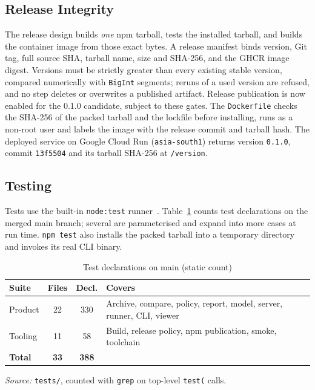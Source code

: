 \documentclass[conference]{IEEEtran}
\newcommand{\code}[1]{\texttt{#1}}
\begin{document}
\subsection{Release Integrity}
The release design builds \emph{one} npm tarball, tests the installed tarball,
and builds the container image from those exact bytes. A release manifest binds
version, Git tag, full source SHA, tarball name, size and SHA-256, and the GHCR
image digest. Versions must be strictly greater than every existing stable
version, compared numerically with \code{BigInt} segments; reruns of a used
version are refused, and no step deletes or overwrites a published artifact.
Release publication is now enabled for the 0.1.0 candidate, subject to these
gates. The \code{Dockerfile} checks the SHA-256 of the packed tarball and the
lockfile before installing, runs as a non-root user and labels the image with
the release commit and tarball hash. The deployed service on Google Cloud Run
(\code{asia-south1}) returns version \code{0.1.0}, commit \code{13f5504} and its
tarball SHA-256 at \code{/version}.

\subsection{Testing}
Tests use the built-in \code{node:test} runner~\cite{nodetest}.
Table~\ref{tab:tests} counts test declarations on the merged main branch; several
are parameterised and expand into more cases at run time. \code{npm test} also
installs the packed tarball into a temporary directory and invokes its real CLI
binary.

\begin{table}[t]
\caption{Test declarations on main (static count)}
\label{tab:tests}
\centering
\footnotesize
\begin{tabular}{@{}p{1.5cm}ccp{3.6cm}@{}}
\toprule
\textbf{Suite} & \textbf{Files} & \textbf{Decl.} & \textbf{Covers}\\
\midrule
Product & 22 & 330 & Archive, compare, policy, report, model, server, runner, CLI, viewer\\
Tooling & 11 & 58 & Build, release policy, npm publication, smoke, toolchain\\
\midrule
\textbf{Total} & \textbf{33} & \textbf{388} & \\
\bottomrule
\end{tabular}
\vspace{1pt}

\textit{Source:} \code{tests/}, counted with \code{grep} on top-level \code{test(} calls.
\end{table}
\end{document}
